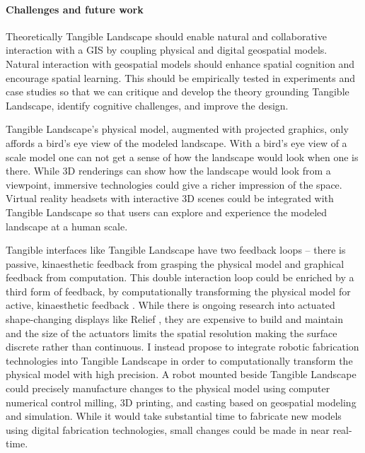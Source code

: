 \documentclass{article}
\begin{document}
\paragraph{Challenges and future work}

Theoretically Tangible Landscape should enable natural and collaborative interaction with a GIS by coupling physical and digital geospatial models.
Natural interaction with geospatial models should enhance spatial cognition and encourage spatial learning. 
This should be empirically tested in experiments and case studies 
so that we can critique and develop the theory grounding Tangible Landscape, 
identify cognitive challenges, and 
improve the design.  








Tangible Landscape's physical model, augmented with projected graphics, only affords a bird's eye view of the modeled landscape. 
With a bird's eye view of a scale model one can not get a sense of how the landscape would look when one is there. 
While 3D renderings can show how the landscape would look from a viewpoint, immersive technologies could give a richer impression of the space. 
Virtual reality headsets with interactive 3D scenes could be integrated with Tangible Landscape so that users can explore and experience the modeled landscape at a human scale. 

Tangible interfaces like Tangible Landscape have two feedback loops -- 
there is passive, kinaesthetic feedback from grasping the physical model 
and graphical feedback from computation.
%
This double interaction loop could be enriched by a third form of feedback, 
by computationally transforming the physical model
for active, kinaesthetic feedback 
\citep{Ishii2008}. 
%
While there is ongoing research into actuated shape-changing displays like Relief \citep{Leithinger2010}, 
they are expensive to build and maintain and 
the size of the actuators limits the spatial resolution making the surface discrete rather than continuous. 
%
I instead propose to integrate robotic fabrication technologies into Tangible Landscape 
in order to computationally transform the physical model with high precision.
A robot mounted beside Tangible Landscape could precisely manufacture changes to the physical model using computer numerical control milling, 3D printing, and casting 
based on geospatial modeling and simulation.
While it would take substantial time to fabricate new models using digital fabrication technologies, small changes could be made in near real-time. 
%
\end{document}

